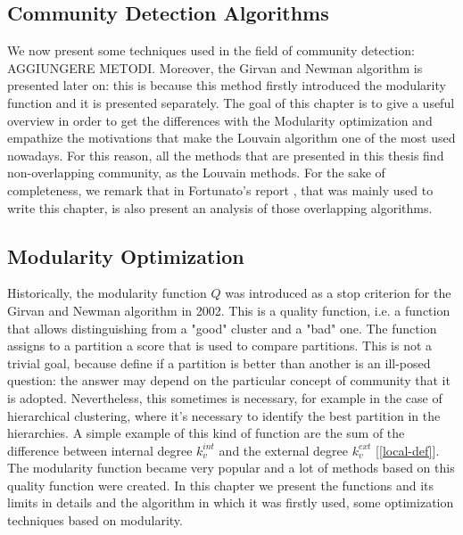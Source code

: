 \subsection{Community Detection Algorithms}
We now present some techniques used in the field of community detection: AGGIUNGERE METODI. Moreover, the Girvan and Newman algorithm is presented later on: this is because this method firstly introduced the modularity function and it is presented separately. The goal of this chapter is to give a useful overview in order to get the differences with the Modularity optimization and empathize the motivations that make the Louvain algorithm one of the most used nowadays. For this reason, all the methods that are presented in this thesis find non-overlapping community, as the Louvain methods. For the sake of completeness, we remark that in Fortunato's report \cite{fortunato}, that was mainly used to write this chapter, is also present an analysis of those overlapping algorithms.


\subsection{Modularity Optimization}
Historically, the modularity function $Q$ was introduced as a stop criterion for the Girvan and Newman algorithm in 2002. This is a quality function, i.e. a function that allows distinguishing from a "good" cluster and a "bad" one. The function assigns to a partition a score that is used to compare partitions. This is not a trivial goal, because define if a partition is better than another is an ill-posed question: the answer may depend on the particular concept of community that it is adopted. Nevertheless, this sometimes is necessary, for example in the case of hierarchical clustering, where it's necessary to identify the best partition in the hierarchies. A simple example of this kind of function are the sum of the difference between internal degree $k_v^{int}$ and the external degree $k_v^{ext}$ [\ref{local-def}]. \\
The modularity function became very popular and a lot of methods based on this quality function were created.
In this chapter we present the functions and its limits in details and the algorithm in which it was firstly used, some optimization techniques based on modularity.
